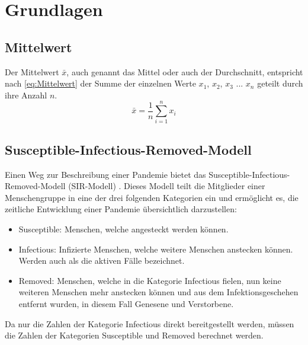 \chapter{Grundlagen}\label{chap:Grundlagen}

\section{Mittelwert}\label{sec:Grundlagen:Mittelwert}
Der Mittelwert $\bar x$, auch genannt das Mittel oder auch der Durchschnitt, entspricht nach \autoref{eq:Mittelwert} der Summe der einzelnen Werte $x_1$, $x_2$, $x_3$ ... $x_n$ geteilt durch ihre Anzahl $n$.
\begin{equation}\label{eq:Mittelwert}
    \bar x = \frac{1}{n}\sum_{i=1}^n x_i
\end{equation}

\section{Susceptible-Infectious-Removed-Modell}\label{sec:Grundlagen:SIR}
Einen Weg zur Beschreibung einer Pandemie bietet das \glqq{}Susceptible-Infectious-Removed-Modell\grqq{} (SIR-Modell) \autocite{SIR}. Dieses Modell teilt die Mitglieder einer Menschengruppe in eine der drei folgenden Kategorien ein und ermöglicht es, die zeitliche Entwicklung einer Pandemie übersichtlich darzustellen:
\begin{itemize}
    \item \glqq{}Susceptible\grqq{}: Menschen, welche angesteckt werden können.
    \item \glqq{}Infectious\grqq{}: Infizierte Menschen, welche weitere Menschen anstecken können. Werden auch als \glqq{}die aktiven Fälle\grqq{} bezeichnet.
    \item \glqq{}Removed\grqq{}: Menschen, welche in die Kategorie \glqq{}Infectious\grqq{} fielen, nun keine weiteren Menschen mehr anstecken können und aus dem Infektionsgeschehen entfernt wurden,
    in diesem Fall Genesene und Verstorbene. 
\end{itemize}

Da nur die Zahlen der Kategorie \glqq{}Infectious\grqq{} direkt bereitgestellt werden, müssen die Zahlen der Kategorien \glqq{}Susceptible\grqq{} und \glqq{}Removed\grqq{} berechnet werden.

